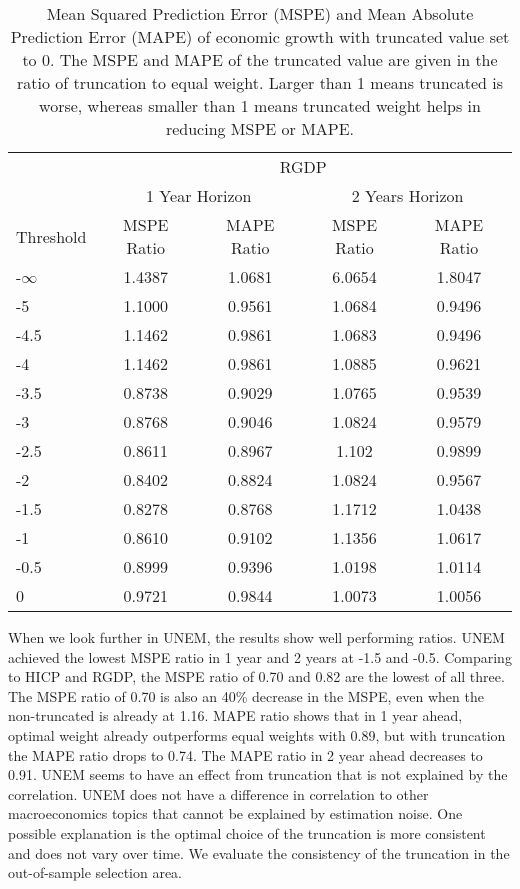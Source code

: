 \documentclass[11pt]{article}
\begin{document}
\begin{table}[!h]
	\centering
	\caption{Mean Squared Prediction Error (MSPE) and Mean Absolute Prediction Error (MAPE) of economic growth with  truncated value set to 0. The MSPE and MAPE of the truncated value are given in the ratio of truncation to equal weight. Larger than 1 means truncated is worse, whereas smaller than 1 means truncated weight helps in reducing MSPE or MAPE.}
	\label{tab: MSPE RGDP}
	\begin{tabular}{lcccc}
		\hline\hline
		& \multicolumn{4}{c}{RGDP}                                                \\
		\cmidrule(lr){2-5}
		& \multicolumn{2}{c}{1 Year Horizon} & \multicolumn{2}{c}{2 Years Horizon} \\
		\cmidrule(lr){2-3} \cmidrule(lr){4-5}
		Threshold & MSPE Ratio &    MAPE Ratio    & MSPE Ratio &    MAPE Ratio    \\ 
		\hline
		-$\infty$ & 1.4387 & 1.0681 & 6.0654 & 1.8047\\ 
		-5 & 1.1000 & 0.9561 & 1.0684 & 0.9496\\ 
		-4.5 & 1.1462 & 0.9861 & 1.0683 & 0.9496\\ 
		-4 & 1.1462 & 0.9861 & 1.0885 & 0.9621\\ 
		-3.5 & 0.8738 & 0.9029 & 1.0765 & 0.9539\\ 
		-3 & 0.8768 & 0.9046 & 1.0824 & 0.9579\\ 
		-2.5 & 0.8611 & 0.8967 & 1.102 & 0.9899\\ 
		-2 & 0.8402 & 0.8824 & 1.0824 & 0.9567\\ 
		-1.5 & 0.8278 & 0.8768 & 1.1712 & 1.0438\\ 
		-1 & 0.8610 & 0.9102 & 1.1356 & 1.0617\\ 
		-0.5 & 0.8999 & 0.9396 & 1.0198 & 1.0114\\ 
		0 & 0.9721 & 0.9844 & 1.0073 & 1.0056\\  \hline\hline
	\end{tabular}
\end{table}


When we look further in UNEM, the results show well performing ratios. UNEM achieved the lowest MSPE ratio in 1 year and 2 years at -1.5 and -0.5. Comparing to HICP and RGDP, the MSPE ratio of 0.70 and 0.82 are the lowest of all three. The MSPE ratio of 0.70 is also an 40\% decrease in the MSPE, even when the non-truncated is already at 1.16. MAPE ratio shows that in 1 year ahead, optimal weight already outperforms equal weights with 0.89, but with truncation the MAPE ratio drops to 0.74. The MAPE ratio in 2 year ahead decreases to 0.91. UNEM seems to have an effect from truncation that is not explained by the correlation. UNEM does not have a difference in correlation to other macroeconomics topics that cannot be explained by estimation noise. One possible explanation is the optimal choice of the truncation is more consistent and does not vary over time. We evaluate the consistency of the truncation in the out-of-sample selection area.
\end{document}
